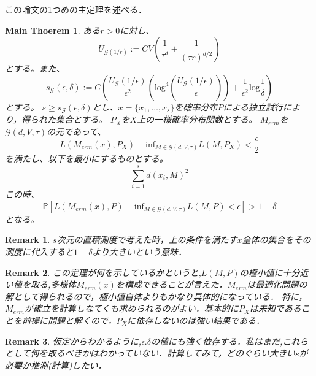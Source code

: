 \documentclass{ujarticle}
\newtheorem*{rem}{Remark}
\newtheorem{mtm}{Main Thoerem}
\begin{document}
この論文の1つめの主定理を述べる．
\begin{mtm}
\label{mth1}
 ある$r > 0$に対し、
 \begin{equation*}
  U_{\mathcal{G}(1/r)}:=CV( \frac{ 1 }{ \tau^d } + \frac{ 1 }{ (\tau r)^{d/2} } )
 \end{equation*}
 とする。また、
 \begin{equation*}
  s_{\mathcal{G}}(\epsilon,\delta):=C(\frac{ U_{\mathcal{G}}(1/\epsilon) }{ \epsilon^2 }(\mathrm{log}^4
  (\frac{U_{\mathcal{G}}(1/\epsilon)}{\epsilon})) + \frac{ 1 }{ \epsilon^2 }\mathrm{log}\frac{ 1 }{ \delta }  )
 \end{equation*}
とする。
$s \ge s_{\mathcal{G}}(\epsilon,\delta)$とし、$x=\{ x_1,\dots,x_s\}$を確率分布$P$による独立試行により，得られた集合とする。
$P_X$を$X$上の一様確率分布関数とする。
$M_{erm}$を$\mathcal{G}(d,V,\tau)$の元であって、
\begin{equation*}
 L(M_{erm}(x),P_X) - \mathrm{inf}_{M \in \mathcal{G}(d,V,\tau)} L(M,P_X) < \frac{ \epsilon }{ 2 }
\end{equation*}
を満たし、以下を最小にするものとする。
\begin{equation*}
 \sum_{i=1}^sd(x_i,M)^2
\end{equation*}
この時、
\begin{equation*}
 \mathbb{P}[L(M_{erm}(x),P) - \mathrm{inf}_{M \in \mathcal{G}(d,V,\tau)} L(M,P) < \epsilon] > 1- \delta
\end{equation*}
となる。
\end{mtm}
\begin{rem}
 $s$次元の直積測度で考えた時，上の条件を満たす$x$全体の集合をその測度に代入すると$1- \delta$より大きいという意味．
\end{rem}
\begin{rem}
 この定理が何を示しているかというと,$L(M,P)$の極小値に十分近い値を取る,多様体$M_{erm}(x)$を構成できることが言えた．$M_{erm}$は最適化問題の解として得られるので，極小値自体よりもかなり具体的になっている．
 特に，$M_{erm}$が確立を計算しなてくも求められるのがよい．基本的に$P_X$は未知であることを前提に問題と解くので，$P_X$に依存しないのは強い結果である．
\end{rem}
\begin{rem}
  仮定からわかるように,$\epsilon.\delta$の値にも強く依存する．私はまだ,これらとして何を取るべきかはわかっていない．計算してみて，どのぐらい大きい$s$が必要か推測(計算)したい．
\end{rem}
\end{document}
